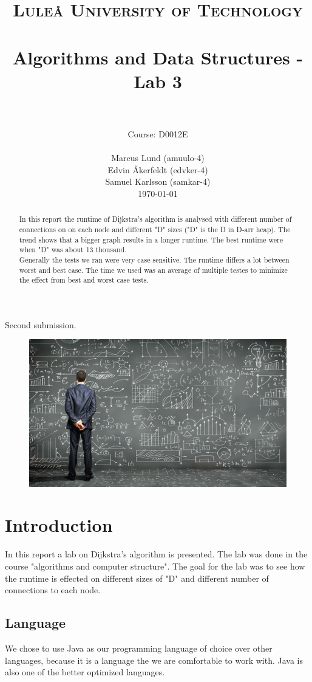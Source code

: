 \documentclass[paper=a4, fontsize=11pt]{scrartcl}
\title{
		\usefont{OT1}{bch}{b}{n}
		\normalfont \normalsize \textsc{Luleå University of Technology} \\ [25pt]
		\horrule{0.5pt} \\[0.4cm]
		\huge Algorithms and Data Structures - Lab 3 \\
		\horrule{2pt} \\[0.5cm]
}
\author{Course: D0012E \\ \\ 
		\normalfont 								\normalsize
        Marcus Lund (amuulo-4) \\\normalfont\normalsize Edvin Åkerfeldt (edvker-4)\\\normalfont\normalsize Samuel Karlsson (samkar-4)\\[-3pt]		\normalsize
        \today
}
\date{}
\numberwithin{equation}{section}		%
\numberwithin{figure}{section}			%
\numberwithin{table}{section}				%
\begin{document}
\maketitle
\centerline{Second submission.}
\begin{figure}[h!]
  \centering
    \includegraphics[width=1\textwidth]{algorithm}
\end{figure}
\newpage

\begin{abstract}
In this report the runtime of Dijkstra’s algorithm is analysed with different number of connections on on each node and different "D" sizes ("D" is the D in D-arr heap). The trend shows that a bigger graph results in a longer runtime. The best runtime were when "D" was about 13 thousand.
\\

Generally the tests we ran were very case sensitive. The runtime differs a lot between worst and best case. The time we used was an average of multiple testes to minimize the effect from best and worst case tests.  
\end{abstract}

\tableofcontents
\newpage

\section{Introduction}
In this report a lab on Dijkstra’s algorithm is presented. The lab was done in the course "algorithms and computer structure". The goal for the lab was to see how the runtime is effected on different sizes of "D" and different number of connections to each node.

\subsection{Language}
We chose to use Java as our programming language of choice over other languages, because it is a language the we are comfortable to work with. Java is also one of the better optimized languages.
\end{document}
